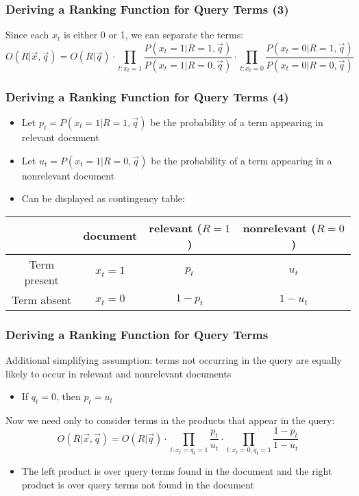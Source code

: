 \documentclass[compress]{beamer}
\begin{document}
\begin{frame}
\frametitle{Deriving a Ranking Function for Query Terms (3)}
\pause

Since each $x_t$ is either 0 or 1, we can separate the terms:
\pause
\begin{equation}
\nonumber
O(R|\vec{x},\vec{q}) = O(R|\vec{q}) \cdot
\prod_{t: x_t=1}
\frac{P(x_t=1|R=1,\vec{q})}{P(x_t=1|R=0,\vec{q})} \cdot
\prod_{t: x_t=0}
\frac{P(x_t=0|R=1,\vec{q})}{P(x_t=0|R=0,\vec{q})}
\end{equation}

\end{frame}
\begin{frame}[<+->]
\frametitle{Deriving a Ranking Function for Query Terms (4)}
\pause
\begin{itemize}
\item Let $p_t = P(x_t=1|R=1,\vec{q})$ be the probability of a term appearing in relevant document 
\pause
\item Let $u_t = P(x_t = 1|R=0,\vec{q})$ be the probability of a term appearing in a nonrelevant document

\pause
\item Can be displayed as contingency table:
\end{itemize}

\bigskip

\begin{tabular}[t]{|cc|cc|}
\hline
             & document & relevant ($R=1$) & nonrelevant ($R=0$) \\ \hline
Term present & $x_t = 1$ & $p_t$ & $u_t$  \\
Term absent  & $x_t = 0$ & $1-p_t$ & $1-u_t$ \\ \hline
\end{tabular}

\end{frame}
\begin{frame}[<+->]
\frametitle{Deriving a Ranking Function for Query Terms}
\pause[2]

Additional simplifying assumption: terms not occurring in the query are equally likely to occur in relevant and nonrelevant documents
\begin{itemize}
\item If $q_t = 0$, then $p_t = u_t$
\end{itemize} 

Now we need only to consider terms in the products that appear in the query:
\begin{equation}
\nonumber
O(R|\vec{x},\vec{q}) = O(R|\vec{q}) \cdot
\prod_{t: x_t = q_t =1}
\frac{p_t}{u_t} \cdot
\prod_{t: x_t=0,q_t=1}
\frac{1-p_t}{1-u_t}
\end{equation}
\begin{itemize}

\item The left product is over query terms found in the document and the right product is over query terms not found in the document
\end{itemize}
\end{frame}
\end{document}
